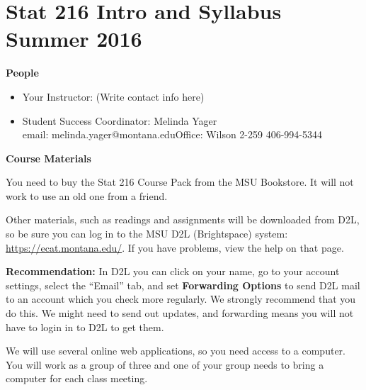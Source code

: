 
\def\theTopic{Intro \& Syllabus }
\def\dayNum{1}

\section{Stat 216 Intro and Syllabus Summer 2016}

\begin{center}
  {\bf People}
\end{center}
\begin{itemize}
\item Your Instructor: (Write contact info here) \vspace{5.5cm}
\item Student Success Coordinator:  Melinda Yager\\
     email: melinda.yager@montana.edu\hfill Office: Wilson 2-259 \hfill
     406-994-5344
\end{itemize}


\begin{center}
  {\bf Course Materials}
\end{center}
  You need to buy the Stat 216  Course Pack from  the MSU
  Bookstore.  It will not work to use an old one from a friend.

  Other materials, such as readings and assignments 
  will be downloaded from D2L, so be
  sure you can log in to the MSU D2L (Brightspace) system:\\
   \url{https://ecat.montana.edu/}.  If you have problems, view the
   help on that page.

  {\bf Recommendation:}  In D2L you can click on your name, go to your
    account settings,  select  the ``Email'' tab, and set {\bf
      Forwarding Options} to send D2L mail to an account which you
    check more regularly.  We strongly recommend that you do this.  We
    might need to send out updates, and forwarding means you will not
    have to login in to D2L to get them.

  We will  use several online web applications,  so you need
  access to a computer.  You will work as a group of three and one of
  your group needs to bring a computer for each class meeting.\\
 
\newpage

